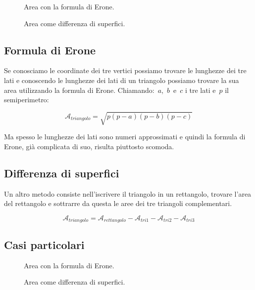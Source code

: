 \begin{inaccessibleblock}
 \begin{figure}[h]
 \centering
 \begin{minipage}[t]{.45\textwidth}
  \centering
  \caption{Area con la formula di Erone.}\label{fig:triangoloerone}
 \end{minipage}\hfil
 \begin{minipage}[t]{.45\textwidth}
  \centering
  \caption{Area come differenza di superfici.}\label{fig:triangolodifferenza}
 \end{minipage}\hfil
\end{figure}
\end{inaccessibleblock}

\subsection*{Formula di Erone}
Se conosciamo le coordinate dei tre vertici possiamo trovare le lunghezze dei 
tre lati e conoscendo le lunghezze dei lati di un triangolo possiamo trovare
la sua area utilizzando la formula di Erone. Chiamando:~$a$,~$b$~e~$c$ i tre 
lati e~$p$ il semiperimetro:

\[\mathcal{A}_{triangolo} = \sqrt{p(p-a)(p-b)(p-c)}\]

Ma spesso le lunghezze dei lati sono numeri approssimati e quindi la formula
di Erone, già complicata di suo, risulta piuttosto scomoda.

\subsection*{Differenza di superfici}
Un altro metodo consiste nell'iscrivere il triangolo in un rettangolo, 
trovare l'area del rettangolo e sottrarre da questa le aree dei tre triangoli 
complementari.

\[\mathcal{A}_{triangolo} = \mathcal{A}_{rettangolo}-\mathcal{A}_{tri1}
                                                    -\mathcal{A}_{tri2}
                                                    -\mathcal{A}_{tri3}\]

\subsection*{Casi particolari}

\begin{inaccessibleblock}
 \begin{figure}[h]
 \centering
 \begin{minipage}[t]{.45\textwidth}
  \centering
  \caption{Area con la formula di Erone.}\label{fig:triangoloparallelox}
 \end{minipage}\hfil
 \begin{minipage}[t]{.45\textwidth}
  \centering
  \caption{Area come differenza di superfici.}\label{fig:triangoloparalleloy}
 \end{minipage}\hfil
\end{figure}
\end{inaccessibleblock}

